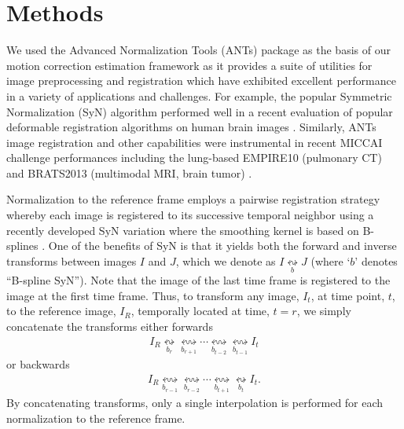 \documentclass{llncs}
\begin{document}
\section{Methods}

We used the Advanced Normalization Tools (ANTs)
package as the basis of our motion correction estimation framework as it provides 
a suite of utilities for image preprocessing and registration which have exhibited 
excellent performance in a variety of applications and challenges.  For example, 
the popular Symmetric Normalization (SyN) algorithm \cite{avants2008,avants2011}
performed well in a recent evaluation of popular deformable registration 
algorithms on human brain images \cite{klein2009}.  Similarly, ANTs image registration and other 
capabilities were instrumental in recent MICCAI challenge performances including 
the lung-based EMPIRE10 (pulmonary CT) \cite{murphy2011} and BRATS2013 
(multimodal MRI, brain tumor) \cite{menze2014}.

Normalization to the reference frame employs a pairwise registration strategy
whereby each image is registered to its successive temporal neighbor using 
a recently developed SyN variation where the smoothing kernel is based on 
B-splines \cite{tustison2013}.  One of the benefits of SyN is that it yields both 
the forward and inverse transforms between images $I$ and $J$, which we denote
as $I \underset{b}{\leftrightsquigarrow} J$ (where `$b$' denotes ``B-spline SyN'').
Note that the image of the last time frame is registered to the image at the 
first time frame.  Thus, to transform any image, $I_t$, at time point, $t$, to the 
reference image, $I_R$, temporally located at time, $t=r$, we simply concatenate 
the transforms either forwards
\begin{align}
I_R  \underset{b_r}{\leftrightsquigarrow} \underset{b_{r+1}}{\leftrightsquigarrow} \cdots
      \underset{b_{t-2}}{\leftrightsquigarrow}\underset{b_{t-1}}{\leftrightsquigarrow} I_t
\end{align}
or backwards
\begin{align}
I_R  \underset{b_{r-1}}{\leftrightsquigarrow} \underset{b_{r-2}}{\leftrightsquigarrow} \cdots
      \underset{b_{t+1}}{\leftrightsquigarrow}\underset{b_t}{\leftrightsquigarrow} I_t.
\end{align}
By concatenating transforms, only a single
interpolation is performed for each normalization to the reference frame.  
\end{document}

